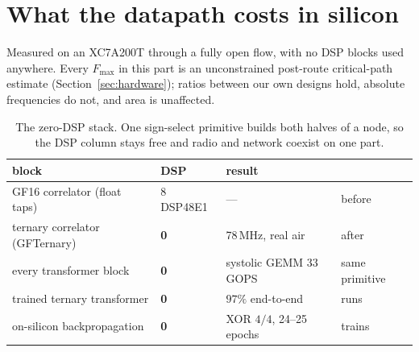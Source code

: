 \documentclass[11pt]{article}
\theoremstyle{definition}
\begin{document}
\section{What the datapath costs in silicon}
\label{sec:silicon}

Measured on an XC7A200T through a fully open flow, with no DSP blocks used
anywhere. Every $F_{\max}$ in this part is an unconstrained post-route
critical-path estimate (Section~\ref{sec:hardware}); ratios between our own
designs hold, absolute frequencies do not, and area is unaffected.

\begin{table}[t]\centering
\caption{The zero-DSP stack. One sign-select primitive builds both halves of a
node, so the DSP column stays free and radio and network coexist on one part.}
\label{tab:zerodsp}
\begin{tabular}{llll}
\toprule
block & DSP & result & \\
\midrule
GF16 correlator (float taps) & 8 DSP48E1 & --- & before \\
ternary correlator (GFTernary) & \textbf{0} & 78\,MHz, real air & after \\
every transformer block & \textbf{0} & systolic GEMM 33\,GOPS & same primitive \\
trained ternary transformer & \textbf{0} & $97\%$ end-to-end & runs \\
on-silicon backpropagation & \textbf{0} & XOR $4/4$, 24--25 epochs & trains \\
\bottomrule
\end{tabular}
\end{table}
\end{document}
